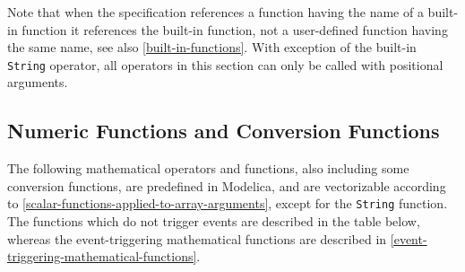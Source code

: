 Note that when the specification references a function having the name
of a built-in function it references the built-in function, not a
user-defined function having the same name, see also \autoref{built-in-functions}. With
exception of the built-in \lstinline!String! operator, all operators in this section
can only be called with positional arguments.

\subsection{Numeric Functions and Conversion Functions}

The following mathematical operators and functions, also including some
conversion functions, are predefined in Modelica, and are vectorizable
according to \autoref{scalar-functions-applied-to-array-arguments}, except for the \lstinline!String! function. The
functions which do not trigger events are described in the table below,
whereas the event-triggering mathematical functions are described in
\autoref{event-triggering-mathematical-functions}.

